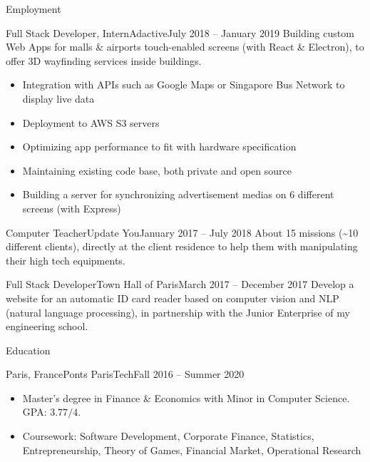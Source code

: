 \documentclass[]{mcdowellcv}
\begin{document}
	\makeheader

	\begin{cvsection}{Employment}
		\begin{cvsubsection}{Full Stack Developer, Intern}{Adactive}{July 2018 -- January 2019}
            Building custom Web Apps for malls \& airports touch-enabled screens (with React \& Electron), to offer 3D wayfinding services inside buildings.
            \begin{itemize}
                \item Integration with APIs such as Google Maps or Singapore Bus Network to display live data
                \item Deployment to AWS S3 servers
                \item Optimizing app performance to fit with hardware specification
                \item Maintaining existing code base, both private and open source
                \item Building a server for synchronizing advertisement medias on 6 different screens (with Express)
			\end{itemize}
		\end{cvsubsection}

		\begin{cvsubsection}{Computer Teacher}{Update You}{January 2017 -- July 2018}
            About 15 missions (\textasciitilde 10 different clients), directly at the client residence to help them with manipulating their high tech equipments.
		\end{cvsubsection}

		\begin{cvsubsection}{Full Stack Developer}{Town Hall of Paris}{March 2017 -- December 2017}
            Develop a website for an automatic ID card reader based on computer vision and NLP (natural language processing), in partnership with the Junior Enterprise of my engineering school.
		\end{cvsubsection}

	\end{cvsection}

	\begin{cvsection}{Education}
		\begin{cvsubsection}{Paris, France}{Ponts ParisTech}{Fall 2016 -- Summer 2020}
			\begin{itemize}
				\item Master's degree in Finance \& Economics with Minor in Computer Science. GPA: \(3.77 / 4\).
				\item Coursework: Software Development, Corporate Finance, Statistics, Entrepreneurship, Theory of Games, Financial Market, Operational Research
			\end{itemize}
		\end{cvsubsection}
	\end{cvsection}
\end{document}
